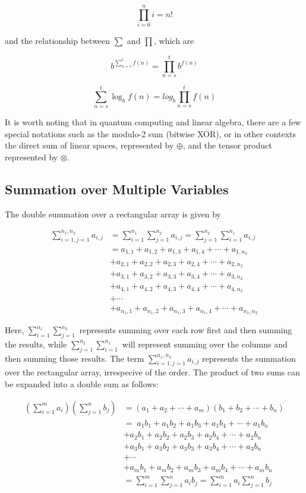 \documentclass[12pt]{article}
\begin{document}
$$\prod_{i=0}^{n} i = n!$$

and the relationship between $\sum$ and $\prod$, which are 

$$b^{\sum_{n=s}^{t} f(n)} = \prod_{n=s}^{t} b^{f(n)}$$

$$\sum_{n=s}^{t} \log_b f(n) = log_b \prod_{n=s}^{t} f(n)$$

It is worth noting that in quantum computing and linear algebra, there are a few special notations such as the modulo-2 sum (bitwise XOR), or in other contexts the direct sum of linear spaces, represented by $\oplus$, and the tensor product represented by $\otimes$.

\subsection{Summation over Multiple Variables}

The double summation over a rectangular array is given by 

\begin{align*}
    \sum_{i=1,j=1}^{n_1, n_2} a_{i,j} &= \sum_{i=1}^{n_1} \sum_{j=1}^{n_2} a_{i, j} = \sum_{j=1}^{n_2} \sum_{i=1}^{n_1} a_{i, j} \\
    &= a_{1, 1} + a_{1, 2} + a_{1, 3} + a_{1, 4} + \cdots + a_{1, n_2} \\
    &+ a_{2, 1} + a_{2, 2} + a_{2, 3} + a_{2, 4} + \cdots + a_{2, n_2} \\
    & + a_{3, 1} + a_{3, 2} + a_{3, 3} + a_{3, 4} + \cdots + a_{3, n_2} \\
    & + a_{4, 1} + a_{4, 2} + a_{4, 3} + a_{4, 4} + \cdots + a_{4, n_2} \\
    & + \cdots \\
    & + a_{n_1, 1} + a_{n_1, 2} + a_{n_1, 3} + a_{n_1, 4} + \cdots + a_{n_1, n_2}
\end{align*}

Here, $\sum_{i=1}^{n_1} \sum_{j=1}^{n_2}$ represents summing over each row first and then summing the results, while $\sum_{j=1}^{n_2} \sum_{i=1}^{n_1}$ will represent summing over the columns and then summing those results. The term $\sum_{i=1,j=1}^{n_1, n_2} a_{i,j}$ represents the summation over the rectangular array, irrespecive of the order. The product of two sums can be expanded into a double sum as follows:

\begin{align*}
\left( \sum_{i=1}^{m} a_i \right) \left( \sum_{j=1}^{n} b_j \right)
    &= (a_1 + a_2 + \cdots + a_m)(b_1 + b_2 + \cdots + b_n) \\
    &=\; a_1b_1 + a_1b_2 + a_1b_3 + a_1b_4 + \cdots + a_1b_n \\
    &+ a_2b_1 + a_2b_2 + a_2b_3 + a_2b_4 + \cdots + a_2b_n \\
    &+ a_3b_1 + a_3b_2 + a_3b_3 + a_3b_4 + \cdots + a_3b_n \\
    &+ \cdots \\
    &+ a_mb_1 + a_mb_2 + a_mb_3 + a_mb_4 + \cdots + a_mb_n \\
    &= \sum_{i=1}^{m} \sum_{j=1}^{n} a_i b_j = \sum_{i=1}^{m} a_i \sum_{j=1}^{n} b_j
\end{align*}
\end{document}

